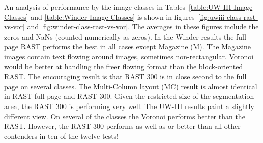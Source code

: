 \documentclass[conference]{IEEEtran}
\begin{document}
An analysis of performance by the image classes in 
Tables~\ref{table:UW-III Image Classes}
and \ref{table:Winder Image Classes}
is shown in 
figures~\ref{fig:uwiii-class-rast-vs-vor} and \ref{fig:winder-class-rast-vs-vor}. 
The averages in these figures include the zeros and NaNs (counted numerically as zeros). In the
Winder results the full page RAST performs the best in all cases except Magazine (M). 
The Magazine images
contain text flowing around images, sometimes non-rectangular. Voronoi would be
better at handling the freer flowing format than the block-oriented RAST.
The encouraging result is that RAST 300 is in
close second to the full page on several classes. The Multi-Column layout (MC)
result is almost identical in RAST full page and RAST 300. Given the
restricted size of the segmentation area, the RAST 300 is performing very
well. The UW-III results paint a slightly
different view. On several of the classes the Voronoi performs better than the
RAST. However, the RAST 300 performs as well as or better than all other
contenders in ten of the twelve tests!

%
%


%
%

\end{document}
